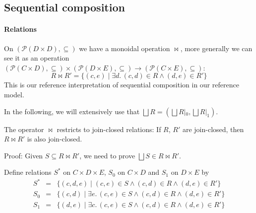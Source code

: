 \documentclass[9pt]{article}
\newcommand{\Pow}{\mathcal{P}}
\newcommand{\bigjoin}{\bigsqcup}
\newcommand{\con}{\wedge}
\newcommand{\imp}{\to}
\begin{document}



\subsection*{Sequential composition}

\paragraph{Relations}

On $(\Pow(D \times D), \subseteq)$ we have a monoidal operation
$\bowtie$, more generally we can see it as an operation
$(\Pow(C \times D), \subseteq) \times (\Pow(D \times E), \subseteq)
\to (\Pow(C \times E), \subseteq)$:
\[
R \bowtie R' = \{ (c,e) \mid \exists d.\, (c,d) \in R \con (d, e) \in R' \}
\]  
This is our reference interpretation of sequential composition in our
reference model.

\bigskip

In the following, we will extensively use that
$\bigjoin R = (\bigjoin R|_0, \bigjoin R|_1)$.

\bigskip

The operator $\bowtie$ restricts to join-closed relations:
If $R$, $R'$ are join-closed, then $R \bowtie R'$ is also join-closed.

Proof: Given $S \subseteq R \bowtie R'$, we need to prove
$\bigjoin S \in R \bowtie R'$.

Define relations $S^*$ on $C \times D \times E$,
$S_0$ on $C \times D$ and $S_1$ on $D \times E$ by
\begin{eqnarray*}
  S^* & = & \{ (c, d, e) \mid (c, e) \in S \con (c, d) \in R \con (d, e) \in R' \} \\
  S_0 & = & \{ (c, d) \mid \exists e.\, (c, e) \in S \con (c, d) \in R \con (d, e) \in R' \} \\
  S_1 & = & \{ (d, e) \mid \exists c.\, (c, e) \in S \con (c, d) \in R \con (d, e) \in R' \}
\end{eqnarray*}  
\end{document}
